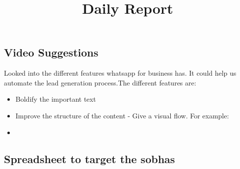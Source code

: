 \documentclass[12pt, a4paper]{article}
\begin{document}
\title{Daily Report}
\maketitle

\subsection{Video Suggestions}

Looked into the different features whatsapp for business has. It could help us automate the lead generation process.The different features are:

\begin{itemize}
    \item Boldify the important text
    \item Improve the structure of the content - Give a visual flow. For example:
    \item
\end{itemize}


\vspace{0.5cm}

\subsection{Spreadsheet to target the sobhas}


\vspace{0.25cm}
\end{document}

